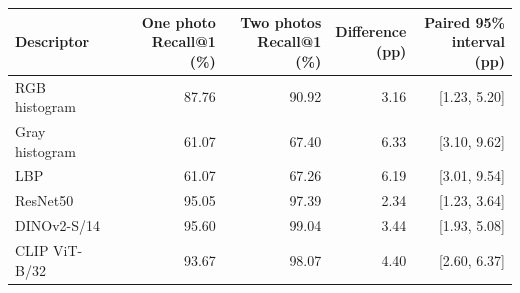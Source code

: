 \begin{tabular}{lrrrr}
\toprule
Descriptor & \makecell{One photo\\Recall@1 (\%)} & \makecell{Two photos\\Recall@1 (\%)} & \makecell{Difference\\(pp)} & \makecell{Paired 95\%\\interval (pp)} \\
\midrule
RGB histogram & 87.76 & 90.92 & 3.16 & [1.23, 5.20] \\
Gray histogram & 61.07 & 67.40 & 6.33 & [3.10, 9.62] \\
LBP & 61.07 & 67.26 & 6.19 & [3.01, 9.54] \\
ResNet50 & 95.05 & 97.39 & 2.34 & [1.23, 3.64] \\
DINOv2-S/14 & 95.60 & 99.04 & 3.44 & [1.93, 5.08] \\
CLIP ViT-B/32 & 93.67 & 98.07 & 4.40 & [2.60, 6.37] \\
\bottomrule
\end{tabular}

